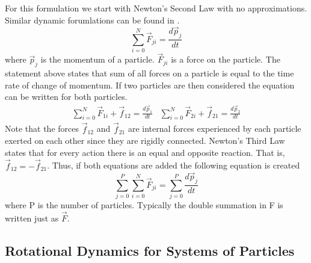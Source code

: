 \documentclass{article}
\begin{document}
For this formulation we start with Newton's Second Law with no
approximations. Similar dynamic forumlations can be found in \cite{etkins,
  phillips,nelson,astrodynamics}.
\begin{equation}
\sum\limits_{i=0}^N \vec{F}_{ji} = \frac{d\vec{p}_j}{dt}
\end{equation}
where $\vec{p}_j$ is the momentum of a particle. $\vec{F}_{ji}$ is a
force on the particle. The statement above states that sum of all
forces on a particle is equal to the time rate of change of
momentum. If two particles are then considered the equation can
be written for both particles.
\begin{equation}
\begin{matrix}
\sum\limits_{i=0}^N \vec{F}_{1i} + \vec{f}_{12} = \frac{d\vec{p}_1}{dt} &
\sum\limits_{i=0}^N \vec{F}_{2i} + \vec{f}_{21} = \frac{d\vec{p}_2}{dt} 
\end{matrix}
\end{equation}
Note that the forces $\vec{f}_{12}$ and $\vec{f}_{21}$ are internal forces
experienced by each particle exerted on each other since they are
rigidly connected. Newton's Third Law states that for every action
there is an equal and opposite reaction. That is, $\vec{f}_{12} = -\vec{f}_{21}$. Thus, if both equations are added the following equation is
created
\begin{equation}
\sum\limits_{j=0}^P \sum\limits_{i=0}^N \vec{F}_{ji} =
\sum\limits_{j=0}^P \frac{d\vec{p}_j}{dt}
\end{equation}
where P is the number of particles. Typically the double summation
in F is written just as $\vec{F}$.

\subsection{Rotational Dynamics for Systems of Particles}
\end{document}
